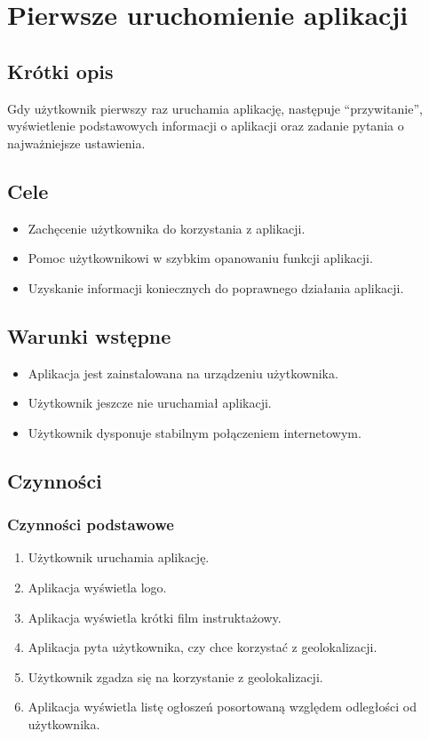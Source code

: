 \documentclass[12pt,a4paper,twoside]{article}
\begin{document}
    
    
    \section{Pierwsze uruchomienie aplikacji}
    
    
    \subsection{Krótki opis}
    Gdy użytkownik pierwszy raz uruchamia aplikację, następuje ``przywitanie'', wyświetlenie podstawowych informacji o aplikacji oraz zadanie pytania o najważniejsze ustawienia.
    
    
    \subsection{Cele}
    \begin{itemize}
        \item Zachęcenie użytkownika do korzystania z aplikacji.
        \item Pomoc użytkownikowi w szybkim opanowaniu funkcji aplikacji.
        \item Uzyskanie informacji koniecznych do poprawnego działania aplikacji.
    \end{itemize}
    
    
    \subsection{Warunki wstępne}
    \begin{itemize}
        \item Aplikacja jest zainstalowana na urządzeniu użytkownika.
        \item Użytkownik jeszcze nie uruchamiał aplikacji.
        \item Użytkownik dysponuje stabilnym połączeniem internetowym.
    \end{itemize}
    
    
    \subsection{Czynności}
    
    \subsubsection{Czynności podstawowe}
    
    
    \begin{enumerate}
        \item Użytkownik uruchamia aplikację.
        \item Aplikacja wyświetla logo.
        \item Aplikacja wyświetla krótki film instruktażowy.
        \item Aplikacja pyta użytkownika, czy chce korzystać z geolokalizacji.
        \item Użytkownik zgadza się na korzystanie z geolokalizacji.
        \item Aplikacja wyświetla listę ogłoszeń posortowaną względem odległości od użytkownika.
    \end{enumerate}
    
\end{document}
